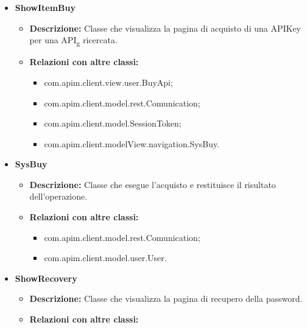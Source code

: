 {{{\begin{itemize}
					\begin{itemize}
						\item \textbf{Descrizione:} Classe che visualizza i commenti relativi all'API\textsubscript{g} visualizzata.
						\item \textbf{Relazioni con altre classi:}
							\begin{itemize}
								\item com.apim.client.model.search.SearchApiComments.
							\end{itemize}
					\end{itemize}
				\item \textbf{ShowItemBuy}
					\begin{itemize}
						\item \textbf{Descrizione:} Classe che visualizza la pagina di acquisto di una APIKey per una API\textsubscript{g} ricercata.
						\item \textbf{Relazioni con altre classi:}
							\begin{itemize}
								\item com.apim.client.view.user.BuyApi;
								\item com.apim.client.model.rest.Comunication;
								\item com.apim.client.model.SessionToken;
								\item com.apim.client.modelView.navigation.SysBuy.
							\end{itemize}
					\end{itemize}
				\item \textbf{SysBuy}
					\begin{itemize}
						\item \textbf{Descrizione:} Classe che esegue l'acquisto e restituisce il risultato dell'operazione.
						\item \textbf{Relazioni con altre classi:}
							\begin{itemize}
								\item com.apim.client.model.rest.Comunication;
								\item com.apim.client.model.user.User.
							\end{itemize}
					\end{itemize}
				\item \textbf{ShowRecovery}
					\begin{itemize}
						\item \textbf{Descrizione:} Classe che visualizza la pagina di recupero della password.
						\item \textbf{Relazioni con altre classi:}

\end{itemize}
\end{itemize}}}}
